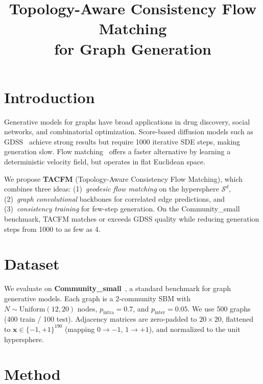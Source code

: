 \documentclass[10pt, twocolumn]{article}
\title{\textbf{Topology-Aware Consistency Flow Matching\\for Graph Generation}}
\author{}
\date{}
\begin{document}
\maketitle
\vspace{-2em}

\section{Introduction}

Generative models for graphs have broad applications in drug discovery, social networks, and combinatorial optimization. Score-based diffusion models such as GDSS~\cite{jo2022gdss} achieve strong results but require 1000 iterative SDE steps, making generation slow. Flow matching~\cite{lipman2023flow} offers a faster alternative by learning a deterministic velocity field, but operates in flat Euclidean space.

We propose \textbf{TACFM} (Topology-Aware Consistency Flow Matching), which combines three ideas: (1)~\emph{geodesic flow matching} on the hypersphere $\mathcal{S}^d$, (2)~\emph{graph convolutional} backbones for correlated edge predictions, and (3)~\emph{consistency training} for few-step generation. On the Community\_small benchmark, TACFM matches or exceeds GDSS quality while reducing generation steps from 1000 to as few as 4.

\section{Dataset}

We evaluate on \textbf{Community\_small}~\cite{niu2020edpgnn}, a standard benchmark for graph generative models. Each graph is a 2-community SBM with $N \sim \text{Uniform}(12, 20)$ nodes, $p_{\text{intra}} = 0.7$, and $p_{\text{inter}} = 0.05$. We use 500 graphs (400 train / 100 test). Adjacency matrices are zero-padded to $20 {\times} 20$, flattened to $\mathbf{x} \in \{-1,+1\}^{190}$ (mapping $0 \to -1$, $1 \to +1$), and normalized to the unit hypersphere.

\section{Method}
\end{document}
